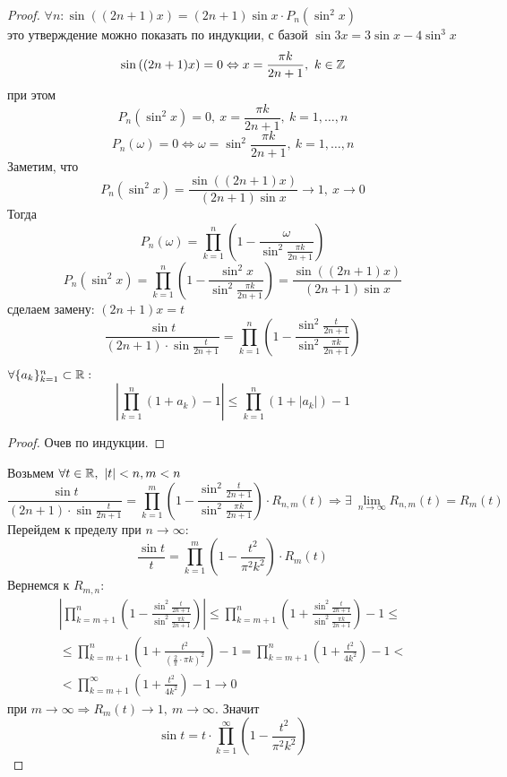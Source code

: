 \begin{proof}
    $\forall n: \sin((2n+1)x)=(2n+1)\sin{x}\cdot P_n(\sin^2{x})$\\
    это утверждение можно показать по индукции, с базой $\sin{3x}=3\sin{x}-4\sin^3{x}$\\
    \[\sin{((2n+1)x)}=0 \Leftrightarrow x=\frac{\pi k}{2n+1},\ k\in \mathbb{Z}\]
    при этом
    \[P_n(\sin^2{x})=0,\ x=\frac{\pi k}{2n+1},\ k=1,\dots,n\]
    \[P_n(\omega)=0 \Leftrightarrow \omega=\sin^2{\frac{\pi k}{2n+1}},\ k=1,\dots, n\]
    Заметим, что
    \[P_n(\sin^2{x})=\frac{\sin((2n+1)x)}{(2n+1)\sin{x}}\to 1,\ x\to 0\]
    Тогда
    \[P_n(\omega)=\prod\limits_{k=1}^{n}(1-\frac{\omega}{\sin^2{\frac{\pi k}{2n+1}}})\]
    \[P_n(\sin^2{x})=\prod\limits_{k=1}^{n}\left(1-\frac{\sin^2{x}}{\sin^2{\frac{\pi k}{2n+1}}}\right)=\frac{\sin((2n+1)x)}{(2n+1)\sin{x}}\]
    сделаем замену: $(2n+1)x=t$
    \[\frac{\sin{t}}{(2n+1)\cdot \sin{\frac{t}{2n+1}}}=\prod\limits_{k=1}^{n}\left(1-\frac{\sin^2{\frac{t}{2n+1}}}{\sin^2{\frac{\pi k}{2n+1}}}\right)\]
    \begin{lemma}
        $\forall \{a_k\}_{k=1}^n\subset \mathbb{R}:$
        \[\left|\prod\limits_{k=1}^{n}(1+a_k)-1\right|\leq \prod\limits_{k=1}^{n}(1+|a_k|)-1\]
    \end{lemma}
    \begin{proof}
        Очев по индукции.
    \end{proof}
    Возьмем $\forall t\in \mathbb{R},\ |t|<n, m<n$
    \[\frac{\sin{t}}{(2n+1)\cdot \sin{\frac{t}{2n+1}}}=\prod\limits_{k=1}^{m}\left(1-\frac{\sin^2\frac{t}{2n+1}}{\sin^2\frac{\pi k}{2n+1}}\right)\cdot R_{n,m}(t) \Rightarrow \exists\ \lim\limits_{n\to\infty}R_{n,m}(t)=R_m(t)\]
    Перейдем к пределу при $n\to \infty$:
    \[\frac{\sin{t}}{t}=\prod\limits_{k=1}^{m}\left(1-\frac{t^2}{\pi^2 k^2}\right)\cdot R_m(t)\]
    Вернемся к $R_{m,n}$:
    \begin{multline*}
        \left|\prod\limits_{k=m+1}^{n}\left(1-\frac{\sin^2\frac{t}{2n+1}}{\sin^2\frac{\pi k}{2n+1}}\right)\right|\leq \prod\limits_{k=m+1}^{n}\left(1+\frac{\sin^2\frac{t}{2n+1}}{\sin^2\frac{\pi k}{2n+1}}\right)-1\leq\\
        \leq \prod\limits_{k=m+1}^{n}\left(1+\frac{t^2}{(\frac{2}{\pi}\cdot \pi k)^2}\right)-1=\prod\limits_{k=m+1}^{n}\left(1+\frac{t^2}{4k^2}\right)-1<\\
        <\prod\limits_{k=m+1}^{\infty}\left(1+\frac{t^2}{4k^2}\right)-1\to 0
    \end{multline*}
    при $m\to \infty \Rightarrow R_m(t)\to 1,\ m\to \infty$. Значит
    \[\sin{t}=t\cdot \prod\limits_{k=1}^{\infty}\left(1-\frac{t^2}{\pi^2 k^2}\right)\]
\end{proof}